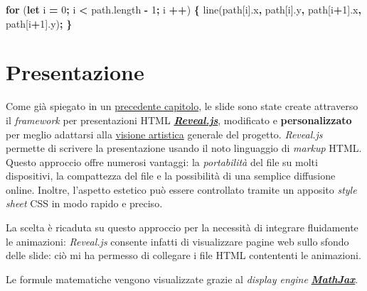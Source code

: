 \documentclass[
]{book}
\newenvironment{Shaded}{\begin{snugshade}}{\end{snugshade}}
\newcommand{\AttributeTok}[1]{\textcolor[rgb]{0.77,0.63,0.00}{#1}}
\newcommand{\ControlFlowTok}[1]{\textcolor[rgb]{0.13,0.29,0.53}{\textbf{#1}}}
\newcommand{\DecValTok}[1]{\textcolor[rgb]{0.00,0.00,0.81}{#1}}
\newcommand{\KeywordTok}[1]{\textcolor[rgb]{0.13,0.29,0.53}{\textbf{#1}}}
\newcommand{\NormalTok}[1]{#1}
\newcommand{\OperatorTok}[1]{\textcolor[rgb]{0.81,0.36,0.00}{\textbf{#1}}}
\newcommand{\VariableTok}[1]{\textcolor[rgb]{0.00,0.00,0.00}{#1}}
\begin{document}
\begin{Shaded}
\begin{Highlighting}[]
\ControlFlowTok{for}\NormalTok{ (}\KeywordTok{let}\NormalTok{ i }\OperatorTok{=} \DecValTok{0}\OperatorTok{;}\NormalTok{ i }\OperatorTok{<} \VariableTok{path}\NormalTok{.}\AttributeTok{length} \OperatorTok{-} \DecValTok{1}\OperatorTok{;}\NormalTok{ i }\OperatorTok{++}\NormalTok{) }\OperatorTok{\{}
  \AttributeTok{line}\NormalTok{(path[i].}\AttributeTok{x}\OperatorTok{,}\NormalTok{ path[i].}\AttributeTok{y}\OperatorTok{,}\NormalTok{ path[i}\OperatorTok{+}\DecValTok{1}\NormalTok{].}\AttributeTok{x}\OperatorTok{,}\NormalTok{ path[i}\OperatorTok{+}\DecValTok{1}\NormalTok{].}\AttributeTok{y}\NormalTok{)}\OperatorTok{;}
\OperatorTok{\}}
\end{Highlighting}
\end{Shaded}

\hypertarget{pressoft}{%
\section{Presentazione}\label{pressoft}}

Come già spiegato in un \protect\hyperlink{presentzione}{precedente capitolo}, le slide sono state create attraverso il \emph{framework} per presentazioni HTML \href{https://revealjs.com/}{\emph{\textbf{Reveal.js}}}, modificato e \textbf{personalizzato} per meglio adattarsi alla \protect\hyperlink{filosofia}{visione artistica} generale del progetto. \emph{Reveal.js} permette di scrivere la presentazione usando il noto linguaggio di \emph{markup} HTML. Questo approccio offre numerosi vantaggi: la \emph{portabilità} del file su molti dispositivi, la compattezza del file e la possibilità di una semplice diffusione online.
Inoltre, l'aspetto estetico può essere controllato tramite un apposito \emph{style sheet} CSS in modo rapido e preciso.

La scelta è ricaduta su questo approccio per la necessità di integrare fluidamente le animazioni: \emph{Reveal.js} consente infatti di visualizzare pagine web sullo sfondo delle slide: ciò mi ha permesso di collegare i file HTML contententi le animazioni.

Le formule matematiche vengono visualizzate grazie al \emph{display engine} \href{https://www.mathjax.org/}{\emph{\textbf{MathJax}}}.

  
\end{document}
